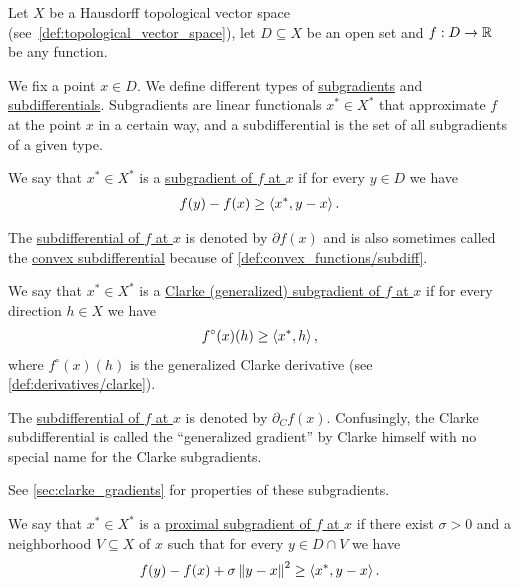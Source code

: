 Let $X$ be a Hausdorff topological vector space (see~\cref{def:topological_vector_space}), let $D \subseteq X$ be an open set and $f: D \to \mathbb{R}$ be any function.

\begin{definition}\label{def:subdifferentials}
  We fix a point $x \in D$. We define different types of \uline{subgradients} and \uline{subdifferentials}. Subgradients are linear functionals $x^* \in X^*$ that approximate $f$ at the point $x$ in a certain way, and a subdifferential is the set of all subgradients of a given type.

  \begin{defenum}
    \item\label{def:subdifferentials/convex}\cite[59]{Clarke2013} We say that $x^* \in X^*$ is a \uline{subgradient of $f$ at $x$} if for every $y \in D$ we have
    \begin{align*}
      f(y) - f(x) \geq \left\langle x^*, y - x \right\rangle.
    \end{align*}

    The \uline{subdifferential of $f$ at $x$} is denoted by $\partial f(x)$ and is also sometimes called the \uline{convex subdifferential} because of \cref{def:convex_functions/subdiff}.

    \item\label{def:subdifferentials/clarke}\cite[definition 10.3]{Clarke2013} We say that $x^* \in X^*$ is a \uline{Clarke (generalized) subgradient of $f$ at $x$} if for every direction $h \in X$ we have
    \begin{align*}
      f^\circ(x)(h) \geq \left\langle x^*, h \right\rangle,
    \end{align*}
    where $f^\circ(x)(h)$ is the generalized Clarke derivative (see \cref{def:derivatives/clarke}).

    The \uline{subdifferential of $f$ at $x$} is denoted by $\partial_C f(x)$. Confusingly, the Clarke subdifferential is called the \enquote{generalized gradient} by Clarke himself with no special name for the Clarke subgradients.

    See \cref{sec:clarke_gradients} for properties of these subgradients.

    \item\label{def:subdifferentials/proximal}\cite[227]{Clarke2013} We say that $x^* \in X^*$ is a \uline{proximal subgradient of $f$ at $x$} if there exist $\sigma > 0$ and a neighborhood $V \subseteq X$ of $x$ such that for every $y \in D \cap V$ we have
    \begin{align*}
      f(y) - f(x) + \sigma \left\Vert y - x \right\Vert^2 \geq \left\langle x^*, y - x \right\rangle.
    \end{align*}


\end{defenum}
\end{definition}
